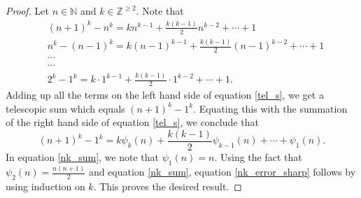 \documentclass[10pt,a4paper]{amsart}
\newtheorem{prp}{Proposition}
\begin{document}
\begin{proof}
Let $n \in \mathbb{N} $ and $k\in \mathbb{Z}^{\geq 2} $. 
Note that
\begin{equation}
\label{tel_s}
\begin{aligned}
&(n+1)^{k}-n^{k}= kn^{k-1}+\frac{k(k-1)}{2} n^{k-2}+ \cdots + 1\\
&n^{k}-(n-1)^{k}= k(n-1)^{k-1}+\frac{k(k-1)}{2} (n-1)^{k-2}+ \cdots + 1\\
&\cdots \\
&\cdots \\
&2^{k}-1^{k}= k \cdot 1^{k-1}+ \frac{k(k-1)}{2} \cdot 1^{k-2} + \cdots+ 1.
\end{aligned}
\end{equation}
Adding up all the terms on 
the left hand side of 
equation 
\eqref{tel_s}, we get a telescopic sum which equals 
$(n+1)^{k}-1^{k}$. 
Equating this with the summation of the right hand 
side of equation \eqref{tel_s}, 
we conclude that     
\begin{equation}
(n+1)^{k}-1^{k} = k\psi_{k}(n)+\frac{k(k-1)}{2} \psi_{k-1}(n)+\cdots+\psi_1(n). 
\label{nk_sum}
\end{equation}
In equation \eqref{nk_sum}, we note that $\psi_{1}(n)=n $.
Using the fact that $\psi_2(n) = \frac{n(n+1)}{2}$ 
and equation \eqref{nk_sum}, equation \eqref{nk_error_sharp} 
follows by using induction on $k$. 
This proves the desired result.  
\end{proof}
\end{document}
